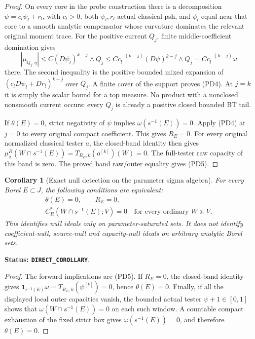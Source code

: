 \documentclass[11pt,a4paper]{article}
\numberwithin{equation}{section}
\newtheorem{corollary}[theorem]{Corollary}
\theoremstyle{definition}
\theoremstyle{remark}
\begin{document}
\begin{proof}
On every core in the probe construction there is a decomposition
$\psi=c_l\psi_l+r_l$, with $c_l>0$, both $\psi_l,r_l$ actual
classical psh, and $\psi_l$ equal near that core to a smooth
analytic compensator whose curvature dominates the relevant
original moment trace. For the positive current $Q_j$, finite
middle-coefficient domination gives
\[
 |\mu_{Q_j,\eta}|
       \leq C(D\psi_l)^{k-j}\wedge Q_j
       \leq Cc_l^{-(k-j)}(D\psi)^{k-j}\wedge Q_j
       = Cc_l^{-(k-j)}\omega
\]
there. The second inequality is the positive bounded mixed
expansion of $(c_lD\psi_l+Dr_l)^{k-j}$ over $Q_j$.
A finite cover of the support proves (PD4). At $j=k$ it
is simply the scalar bound for a top measure. No product
with a nonclosed nonsmooth current occurs: every $Q_j$ is
already a positive closed bounded BT tail.

If $\theta(E)=0$, strict negativity of $\psi$ implies
$\omega(s^{-1}(E))=0$. Apply (PD4) at $j=0$ to every
original compact coefficient. This gives $R_E=0$.
For every original normalized classical tester $a$, the
closed-band identity then gives
$\mu_a^R(W\cap s^{-1}(E))=T_{R_E,k}(a^{[k]})(W)=0$.
The full-tester raw capacity of this band is zero.
The proved band raw/outer equality gives (PD5).
\end{proof}

\begin{corollary}[Exact null detection on the parameter sigma algebra]
\label{cor:r12-parameter-exact-null-ideal}
For every Borel $E\subset J$, the following conditions are equivalent:
\[
 \begin{gathered}
 \theta(E)=0,\qquad R_E=0,\\
 C_R^*(W\cap s^{-1}(E);V)=0
       \quad\text{for every ordinary }W\Subset V.
 \end{gathered}
 \tag{PD5a}
\]
This identifies null ideals only on parameter-saturated sets.
It does not identify coefficient-null, source-null and capacity-null
ideals on arbitrary analytic Borel sets.
\end{corollary}

\noindent\textbf{Status: \texttt{DIRECT\_COROLLARY}}.

\begin{proof}
The forward implications are (PD5). If $R_E=0$, the closed-band
identity gives $\mathbf1_{s^{-1}(E)}\omega=T_{R_E,k}(\psi^{[k]})=0$,
hence $\theta(E)=0$. Finally, if all the displayed local outer
capacities vanish, the bounded actual tester $\psi+1\in[0,1]$
shows that $\omega(W\cap s^{-1}(E))=0$ on each such window.
A countable compact exhaustion of the fixed strict box gives
$\omega(s^{-1}(E))=0$, and therefore $\theta(E)=0$.
\end{proof}
\end{document}

